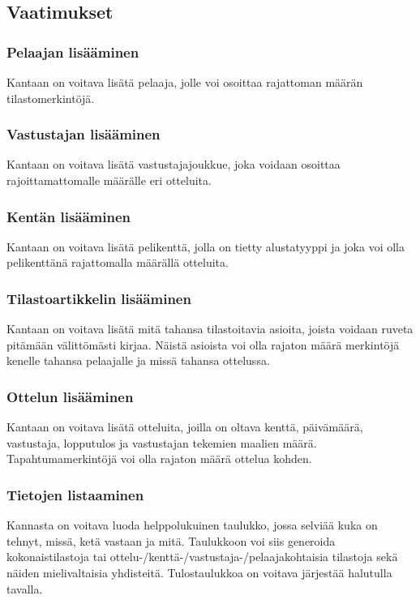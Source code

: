 \documentclass[12pt]{article} %
\begin{document}
\subsection{Vaatimukset} %

\subsubsection{Pelaajan lisääminen} %
Kantaan on voitava lisätä pelaaja, jolle voi osoittaa rajattoman määrän tilastomerkintöjä.


\subsubsection{Vastustajan lisääminen} %
Kantaan on voitava lisätä vastustajajoukkue, joka voidaan osoittaa rajoittamattomalle määrälle eri otteluita.



\subsubsection{Kentän lisääminen} %
Kantaan on voitava lisätä pelikenttä, jolla on tietty alustatyyppi ja joka voi olla pelikenttänä rajattomalla määrällä otteluita.

\subsubsection{Tilastoartikkelin lisääminen}
Kantaan on voitava lisätä mitä tahansa tilastoitavia asioita, joista voidaan ruveta pitämään välittömästi kirjaa. Näistä asioista voi olla rajaton määrä merkintöjä kenelle tahansa pelaajalle ja missä tahansa ottelussa.

\subsubsection{Ottelun lisääminen}
Kantaan on voitava lisätä otteluita, joilla on oltava kenttä, päivämäärä, vastustaja, lopputulos ja vastustajan tekemien maalien määrä. Tapahtumamerkintöjä voi olla rajaton määrä ottelua kohden.

\subsubsection{Tietojen listaaminen}
Kannasta on voitava luoda helppolukuinen taulukko, jossa selviää kuka on tehnyt, missä, ketä vastaan ja mitä. Taulukkoon voi siis generoida kokonaistilastoja tai ottelu-/kenttä-/vastustaja-/pelaajakohtaisia tilastoja sekä näiden mielivaltaisia yhdisteitä. Tulostaulukkoa on voitava järjestää halutulla tavalla.
\end{document}
